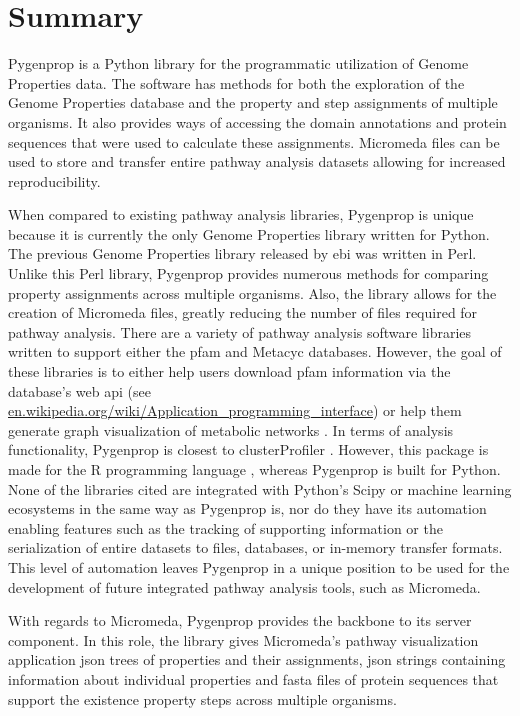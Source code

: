 \section{Summary} \label{pygenprop-summary}

Pygenprop is a Python library for the programmatic utilization of Genome 
Properties data. The software has methods for both the exploration of the Genome 
Properties database and the property and step assignments of multiple organisms. 
It also provides ways of accessing the domain annotations and protein sequences 
that were used to calculate these assignments. Micromeda files can be used to 
store and transfer entire pathway analysis datasets allowing for increased 
reproducibility.

When compared to existing pathway analysis libraries, Pygenprop is unique 
because it is currently the only Genome Properties library written for Python. 
The previous Genome Properties library released by \gls{ebi} was written in 
Perl. Unlike this Perl library, Pygenprop provides numerous methods for 
comparing property assignments across multiple organisms. Also, the library 
allows for the creation of Micromeda files, greatly reducing the number of files 
required for pathway analysis. There are a variety of pathway analysis software 
libraries written to support either the \gls{pfam} 
\cite{zhang2009kegggraph,posma2013metabonetworks,yu2012clusterprofiler,cock2009biopython} 
and Metacyc \cite{international} databases. However, the goal of these libraries 
is to either help users download \gls{pfam} information via the database's web 
\gls{api} \cite{cock2009biopython} (see 
\href{http://en.wikipedia.org/wiki/Application_programming_interface}{en.wikipedia.org/wiki/Application\_programming\_interface}) 
or help them generate graph visualization of metabolic networks 
\cite{posma2013metabonetworks}. In terms of analysis functionality, Pygenprop is 
closest to clusterProfiler \cite{yu2012clusterprofiler}. However, this package 
is made for the R programming language \cite{rprogman}, whereas Pygenprop is 
built for Python. None of the libraries cited are integrated with Python's Scipy 
\cite{scipystack} or machine learning ecosystems in the same way as Pygenprop 
is, nor do they have its automation enabling features such as the tracking of 
supporting information or the serialization of entire datasets to files, 
databases, or in-memory transfer formats. This level of automation leaves 
Pygenprop in a unique position to be used for the development of future 
integrated pathway analysis tools, such as Micromeda.

With regards to Micromeda, Pygenprop provides the backbone to its server 
component. In this role, the library gives Micromeda's pathway visualization application 
\gls{json} trees of properties and their assignments, \gls{json} strings 
containing information about individual properties and \gls{fasta} files of protein 
sequences that support the existence property steps across multiple organisms.
